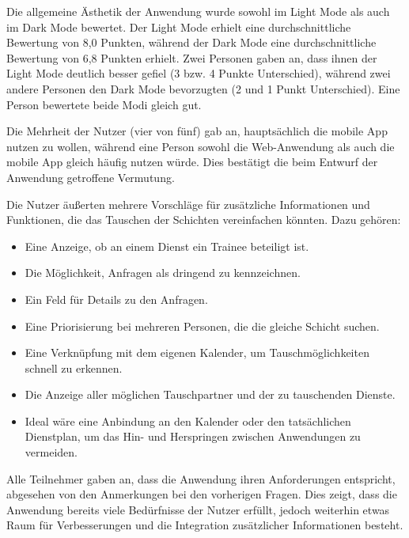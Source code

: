 Die allgemeine Ästhetik der Anwendung wurde sowohl im Light Mode als auch im Dark Mode bewertet. Der Light Mode erhielt eine durchschnittliche Bewertung von 8,0 Punkten, während der Dark Mode eine durchschnittliche Bewertung von 6,8 Punkten erhielt. Zwei Personen gaben an, dass ihnen der Light Mode deutlich besser gefiel (3 bzw. 4 Punkte Unterschied), während zwei andere Personen den Dark Mode bevorzugten (2 und 1 Punkt Unterschied). Eine Person bewertete beide Modi gleich gut.

Die Mehrheit der Nutzer (vier von fünf) gab an, hauptsächlich die mobile App nutzen zu wollen, während eine Person sowohl die Web-Anwendung als auch die mobile App gleich häufig nutzen würde. Dies bestätigt die beim Entwurf der Anwendung getroffene Vermutung.

Die Nutzer äußerten mehrere Vorschläge für zusätzliche Informationen und Funktionen, die das Tauschen der Schichten vereinfachen könnten. Dazu gehören:

\begin{itemize}
    \item Eine Anzeige, ob an einem Dienst ein Trainee beteiligt ist.
    \item Die Möglichkeit, Anfragen als dringend zu kennzeichnen.
    \item Ein Feld für Details zu den Anfragen.
    \item Eine Priorisierung bei mehreren Personen, die die gleiche Schicht suchen.
    \item Eine Verknüpfung mit dem eigenen Kalender, um Tauschmöglichkeiten schnell zu erkennen.
    \item Die Anzeige aller möglichen Tauschpartner und der zu tauschenden Dienste.
    \item Ideal wäre eine Anbindung an den Kalender oder den tatsächlichen Dienstplan, um das Hin- und Herspringen zwischen Anwendungen zu vermeiden.
  \end{itemize}

Alle Teilnehmer gaben an, dass die Anwendung ihren Anforderungen entspricht, abgesehen von den Anmerkungen bei den vorherigen Fragen. Dies zeigt, dass die Anwendung bereits viele Bedürfnisse der Nutzer erfüllt, jedoch weiterhin etwas Raum für Verbesserungen und die Integration zusätzlicher Informationen besteht.